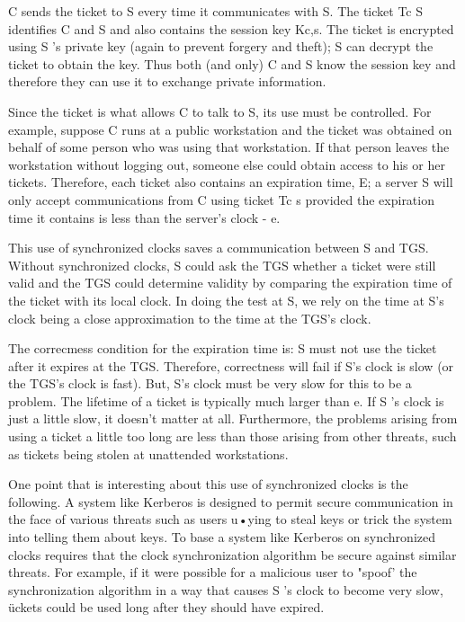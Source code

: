 \documentclass[a4paper,11pt,notitlepage,twoside,openright]{article}
\begin{document}
C sends the ticket to S every time it communicates with S. The ticket Tc
S identifies C and S and also contains the session key Kc,s. The ticket
is encrypted using S 's private key (again to prevent forgery and
theft); S can decrypt the ticket to obtain the key. Thus both (and only)
C and S know the session key and therefore they can use it to exchange
private information.

Since the ticket is what allows C to talk to S, its use must be
controlled. For example, suppose C runs at a public workstation and the
ticket was obtained on behalf of some person who was using that
workstation. If that person leaves the workstation without logging out,
someone else could obtain access to his or her tickets. Therefore, each
ticket also contains an expiration time, E; a server S will only accept
communications from C using ticket Tc s provided the expiration time it
contains is less than the server's clock - e.

This use of synchronized clocks saves a communication between S and TGS.
Without synchronized clocks, S could ask the TGS whether a ticket were
still valid and the TGS could determine validity by comparing the
expiration time of the ticket with its local clock. In doing the test at
S, we rely on the time at S's clock being a close approximation to the
time at the TGS's clock.

The correcmess condition for the expiration time is: S must not use the
ticket after it expires at the TGS. Therefore, correctness will fail if
S's clock is slow (or the TGS's clock is fast). But, S's clock must be
very slow for this to be a problem. The lifetime of a ticket is
typically much larger than e. If S 's clock is just a little slow, it
doesn't matter at all. Furthermore, the problems arising from using a
ticket a little too long are less than those arising from other threats,
such as tickets being stolen at unattended workstations.

One point that is interesting about this use of synchronized clocks is
the following. A system like Kerberos is designed to permit secure
communication in the face of various threats such as users u•ying to
steal keys or trick the system into telling them about keys. To base a
system like Kerberos on synchronized clocks requires that the clock
synchronization algorithm be secure against similar threats. For
example, if it were possible for a malicious user to "spoof' the
synchronization algorithm in a way that causes S 's clock to become very
slow, ückets could be used long after they should have expired.
\end{document}
